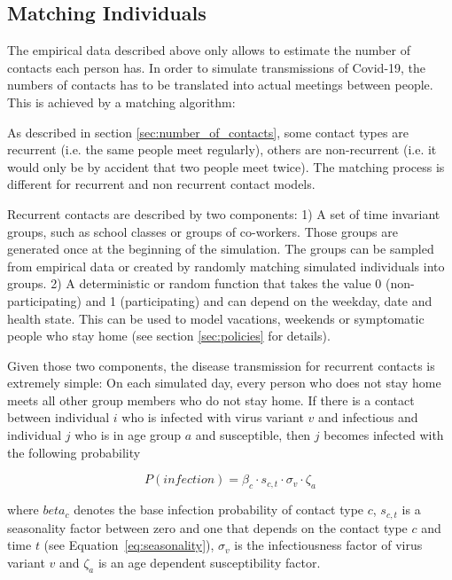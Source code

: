 \subsection{Matching Individuals}
\label{sec:matching}

The empirical data described above only allows to estimate the number of contacts each
person has. In order to simulate transmissions of Covid-19, the numbers of contacts has
to be translated into actual meetings between people. This is achieved by a matching
algorithm:

As described in section \ref{sec:number_of_contacts}, some contact types are recurrent
(i.e. the same people meet regularly), others are non-recurrent (i.e. it would only be
by accident that two people meet twice). The matching process is different for recurrent
and non recurrent contact models.

Recurrent contacts are described by two components: 1) A set of time invariant groups,
such as school classes or groups of co-workers. Those groups are generated once at the
beginning of the simulation. The groups can be sampled from empirical data or created by
randomly matching simulated individuals into groups. 2) A deterministic or random
function that takes the value 0 (non-participating) and 1 (participating) and can depend
on the weekday, date and health state. This can be used to model vacations, weekends or
symptomatic people who stay home (see section \ref{sec:policies} for details).

Given those two components, the disease transmission for recurrent contacts is extremely
simple: On each simulated day, every person who does not stay home meets all other group
members who do not stay home. If there is a contact between individual $i$ who is
infected with virus variant $v$ and infectious and individual $j$ who is in age group
$a$ and susceptible, then $j$ becomes infected with the following probability

\begin{equation}
    \label{eq:infection_probability_formula}
    P(infection) = \beta_c \cdot s_{c, t} \cdot \sigma_v \cdot \zeta_a
\end{equation}

where $beta_c$ denotes the base infection probability of contact type $c$,
$s_{c, t}$ is a seasonality factor between zero and one that depends on the contact
type $c$ and time $t$ (see Equation~\ref{eq:seasonality}), $\sigma_v$ is the
infectiousness factor of virus variant $v$ and $\zeta_a$ is an age dependent
susceptibility factor.

